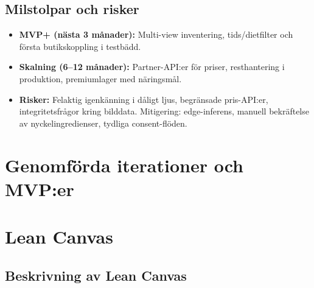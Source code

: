 \documentclass[a4paper,12pt]{article}
\begin{document}
\subsection{Milstolpar och risker}
\begin{itemize}
    \item \textbf{MVP+ (nästa 3 månader):} Multi-view inventering, tids/dietfilter och första butikskoppling i testbädd.
    \item \textbf{Skalning (6–12 månader):} Partner-API:er för priser, resthantering i produktion, premiumlager med näringsmål.
    \item \textbf{Risker:} Felaktig igenkänning i dåligt ljus, begränsade pris-API:er, integritetsfrågor kring bilddata. Mitigering: edge-inferens, manuell bekräftelse av nyckelingredienser, tydliga consent-flöden.
\end{itemize}




\section{Genomförda iterationer och MVP:er}




\section{Lean Canvas}

\subsection{Beskrivning av Lean Canvas}
\end{document}
